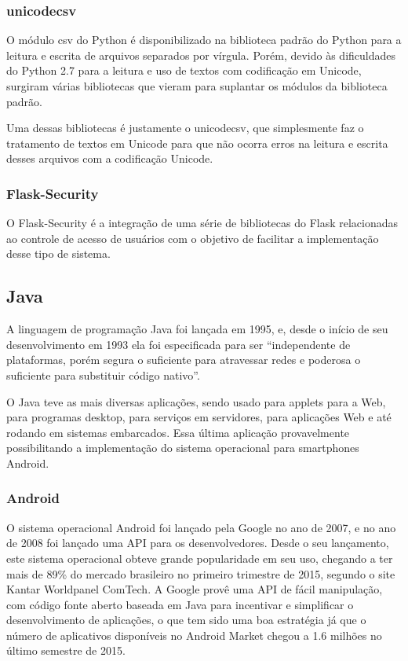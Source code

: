\documentclass[
	article,			%
	11pt,				%
	oneside,			%
	a4paper,			%
	english,			%
	brazil,				%
	sumario=tradicional
	]{abntex2}
\begin{document}
\subsubsection{unicodecsv}

O módulo csv do Python é disponibilizado na biblioteca padrão do Python para a leitura e escrita de arquivos separados por vírgula.
Porém, devido às dificuldades do Python 2.7 para a leitura e uso de textos com codificação em Unicode, surgiram várias bibliotecas que vieram para suplantar os módulos da biblioteca padrão.

Uma dessas bibliotecas é justamente o unicodecsv, que simplesmente faz o tratamento de textos em Unicode para que não ocorra erros na leitura e escrita desses arquivos com a codificação Unicode. \cite{unicodecsv}

\subsubsection{Flask-Security}

O Flask-Security é a integração de uma série de bibliotecas do Flask relacionadas ao controle de acesso de usuários com o objetivo de facilitar a implementação desse tipo de sistema. \cite{flasksecurity}

\subsection{Java}

A linguagem de programação Java foi lançada em 1995, e, desde o início de seu desenvolvimento em 1993 ela foi especificada para ser “independente de plataformas, porém segura o suficiente para atravessar redes e poderosa o suficiente para substituir código nativo”. \cite{java}

O Java teve as mais diversas aplicações, sendo usado para applets para a Web, para programas desktop, para serviços em servidores, para aplicações Web e até rodando em sistemas embarcados.
Essa última aplicação provavelmente possibilitando a implementação do sistema operacional para smartphones Android.

\subsubsection{Android}

O sistema operacional Android foi lançado pela Google no ano de 2007, e no ano de 2008 foi lançado uma API para os desenvolvedores.
Desde o seu lançamento, este sistema operacional obteve grande popularidade em seu uso, chegando a ter mais de 89\% do mercado brasileiro no primeiro trimestre de 2015, segundo o site Kantar Worldpanel ComTech. \cite{comtech}
A Google provê uma API de fácil manipulação, com código fonte aberto baseada em Java para incentivar e simplificar o desenvolvimento de aplicações, o que tem sido uma boa estratégia já que o número de aplicativos disponíveis no Android Market chegou a 1.6 milhões no último semestre de 2015.
\end{document}
